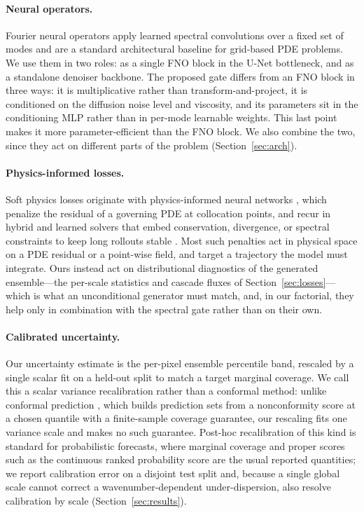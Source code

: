 \documentclass[10pt]{article} %
\begin{document}
\paragraph{Neural operators.} Fourier neural operators \citep{li2021fno, kovachki2023neural} apply learned spectral convolutions over a fixed set of modes and are a standard architectural baseline for grid-based PDE problems. We use them in two roles: as a single FNO block in the U-Net bottleneck, and as a standalone denoiser backbone. The proposed gate differs from an FNO block in three ways: it is multiplicative rather than transform-and-project, it is conditioned on the diffusion noise level and viscosity, and its parameters sit in the conditioning MLP rather than in per-mode learnable weights. This last point makes it more parameter-efficient than the FNO block. We also combine the two, since they act on different parts of the problem (Section~\ref{sec:arch}).

\paragraph{Physics-informed losses.} Soft physics losses originate with physics-informed neural networks \citep{raissi2019physics}, which penalize the residual of a governing PDE at collocation points, and recur in hybrid and learned solvers that embed conservation, divergence, or spectral constraints to keep long rollouts stable \citep{kochkov2021machine, stachenfeld2022learned}. Most such penalties act in physical space on a PDE residual or a point-wise field, and target a trajectory the model must integrate. Ours instead act on distributional diagnostics of the generated ensemble---the per-scale statistics and cascade fluxes of Section~\ref{sec:losses}---which is what an unconditional generator must match, and, in our factorial, they help only in combination with the spectral gate rather than on their own.

\paragraph{Calibrated uncertainty.} Our uncertainty estimate is the per-pixel ensemble percentile band, rescaled by a single scalar fit on a held-out split to match a target marginal coverage. We call this a scalar variance recalibration rather than a conformal method: unlike conformal prediction \citep{vovk2005algorithmic, angelopoulos2021gentle}, which builds prediction sets from a nonconformity score at a chosen quantile with a finite-sample coverage guarantee, our rescaling fits one variance scale and makes no such guarantee. Post-hoc recalibration of this kind is standard for probabilistic forecasts, where marginal coverage and proper scores such as the continuous ranked probability score \citep{matheson1976scoring, gneiting2007strictly} are the usual reported quantities; we report calibration error on a disjoint test split and, because a single global scale cannot correct a wavenumber-dependent under-dispersion, also resolve calibration by scale (Section~\ref{sec:results}).
\end{document}
